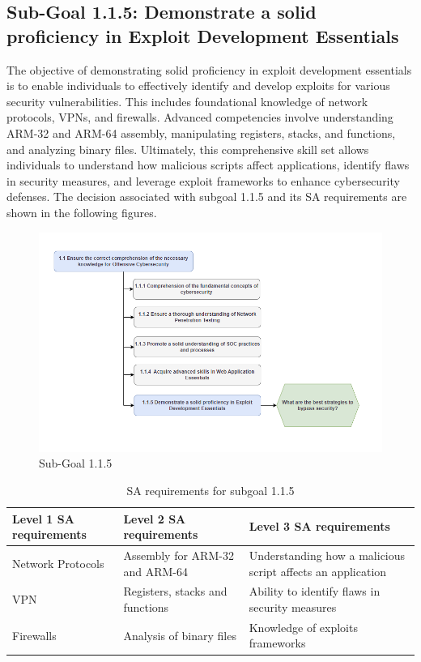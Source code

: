 \newpage
\subsection{Sub-Goal 1.1.5: Demonstrate a solid proficiency in Exploit Development Essentials}
The objective of demonstrating solid proficiency in exploit development essentials is to enable individuals to effectively identify and develop exploits for various security vulnerabilities. This includes foundational knowledge of network protocols, VPNs, and firewalls. Advanced competencies involve understanding ARM-32 and ARM-64 assembly, manipulating registers, stacks, and functions, and analyzing binary files. Ultimately, this comprehensive skill set allows individuals to understand how malicious scripts affect applications, identify flaws in security measures, and leverage exploit frameworks to enhance cybersecurity defenses.
The decision associated with subgoal 1.1.5 and its SA requirements are shown in the following figures.

\begin{figure}[H]
  \centering
  \includegraphics[width=\textwidth]{./assets/subgoal_1.1.5.png}
  \caption{Sub-Goal 1.1.5}
  \label{fig:subgoal1.1.5}
\end{figure}

\begin{table}[H]
    \begin{center}
    \begin{tabular}{ | m{5cm} | m{5cm}| m{5cm} | } 
      \hline
      \textbf{Level 1 SA requirements} & \textbf{Level 2 SA requirements}  & \textbf{Level 3 SA requirements}  \\ 
      \hline
      Network Protocols & Assembly for ARM-32 and ARM-64 & Understanding how a malicious script affects an application\\ 
      \hline
      VPN &  Registers, stacks and functions & Ability to identify flaws in security measures\\ 
      \hline
      Firewalls & Analysis of binary files & Knowledge of exploits frameworks\\  
      \hline
    \end{tabular}
    \end{center}
    \caption{SA requirements for subgoal 1.1.5}
    \end{table}

